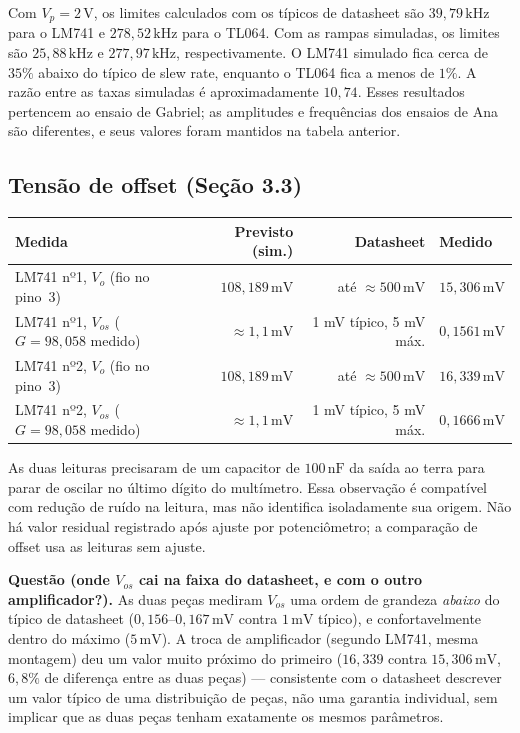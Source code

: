 \documentclass[11pt,a4paper]{article}
\begin{document}
Com \(V_p=2\,\text{V}\), os limites calculados com os típicos de datasheet são
\(39{,}79\,\text{kHz}\) para o LM741 e \(278{,}52\,\text{kHz}\) para o TL064.
Com as rampas simuladas, os limites são \(25{,}88\,\text{kHz}\) e
\(277{,}97\,\text{kHz}\), respectivamente. O LM741 simulado fica cerca de
\(35\%\) abaixo do típico de slew rate, enquanto o TL064 fica a menos de \(1\%\).
A razão entre as taxas simuladas é aproximadamente \(10{,}74\).
Esses resultados pertencem ao ensaio de Gabriel; as amplitudes e frequências dos
ensaios de Ana são diferentes, e seus valores foram mantidos na tabela anterior.

\subsection{Tensão de offset (Seção 3.3)}

\begin{center}\small
\setlength{\tabcolsep}{4pt}
\begin{tabular}{@{}lrrl@{}}
\toprule
\textbf{Medida} & \textbf{Previsto (sim.)} & \textbf{Datasheet} & \textbf{Medido} \\
\midrule
LM741 nº1, \(V_o\) (fio no pino~3) & \(108{,}189\,\text{mV}\) & até \({\approx}500\,\text{mV}\) &
  \(15{,}306\,\text{mV}\) \\
LM741 nº1, \(V_{os}\) (\(G{=}98{,}058\) medido) & \({\approx}1{,}1\,\text{mV}\) & 1 mV típico, 5 mV máx. & \(0{,}1561\,\text{mV}\) \\
LM741 nº2, \(V_o\) (fio no pino~3) & \(108{,}189\,\text{mV}\) & até \({\approx}500\,\text{mV}\) &
  \(16{,}339\,\text{mV}\) \\
LM741 nº2, \(V_{os}\) (\(G{=}98{,}058\) medido) & \({\approx}1{,}1\,\text{mV}\) & 1 mV típico, 5 mV máx. & \(0{,}1666\,\text{mV}\) \\
\bottomrule
\end{tabular}
\end{center}

As duas leituras precisaram de um capacitor de \(100\,\text{nF}\) da saída ao terra para parar de
oscilar no último dígito do multímetro. Essa observação é compatível com redução de ruído
na leitura, mas não identifica isoladamente sua origem. Não há valor residual registrado
após ajuste por potenciômetro; a comparação de offset usa as leituras sem ajuste.

\textbf{Questão (onde \(V_{os}\) cai na faixa do datasheet, e com o outro amplificador?).} As
duas peças mediram \(V_{os}\) uma ordem de grandeza \emph{abaixo} do típico de datasheet
(\(0{,}156\)--\(0{,}167\,\text{mV}\) contra \(1\,\text{mV}\) típico), e confortavelmente dentro do
máximo (\(5\,\text{mV}\)). A troca de amplificador (segundo LM741, mesma montagem) deu um valor
muito próximo do primeiro (\(16{,}339\) contra \(15{,}306\,\text{mV}\), \(6{,}8\%\) de diferença
entre as duas peças) — consistente com o datasheet descrever um valor típico de uma distribuição
de peças, não uma garantia individual, sem implicar que as duas peças tenham exatamente os mesmos parâmetros.
\end{document}
